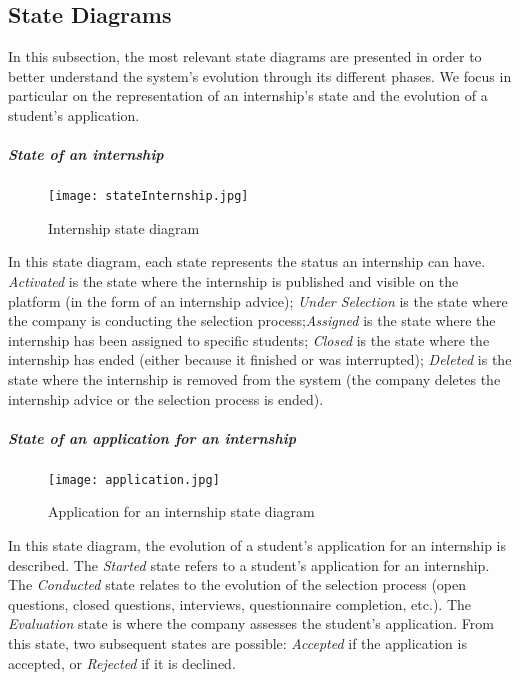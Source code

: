 			
			
			
			
			\subsection{State Diagrams}
				In this subsection, the most relevant state diagrams are presented in order to better understand the system's evolution through its different phases. We focus in particular on the representation of an internship's state and the evolution of a student's application.
				
				\subparagraph{State of an internship}
					\begin{figure}[H]
						\centering
						\texttt{[image: stateInternship.jpg]}
						\caption{Internship state diagram}
					\end{figure}
					
					In this state diagram, each state represents the status an internship can have. \textit{Activated} is the state where the internship is published and visible on the platform (in the form of an internship advice); \textit{Under Selection} is the state where the company is conducting the selection process;\textit{Assigned} is the state where the internship has been assigned to specific students; \textit{Closed} is the state where the internship has ended (either because it finished or was interrupted); \textit{Deleted} is the state where the internship is removed from the system (the company deletes the internship advice or the selection process is ended).
					
				\subparagraph{State of an application for an internship}
					\begin{figure}[H]
						\centering
						\texttt{[image: application.jpg]}
						\caption{Application for an internship state diagram}
					\end{figure}
					
					In this state diagram, the evolution of a student's application for an internship is described. The \textit{Started} state refers to a student's application for an internship. The \textit{Conducted} state relates to the evolution of the selection process (open questions, closed questions, interviews, questionnaire completion, etc.). The \textit{Evaluation} state is where the company assesses the student's application. From this state, two subsequent states are possible: \textit{Accepted} if the application is accepted, or \textit{Rejected} if it is declined.
					
